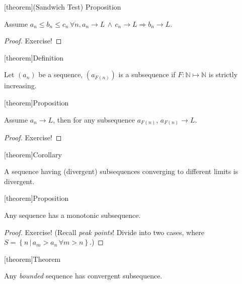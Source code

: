 \documentclass[12pt]{report}
\theoremstyle{definition}
\begin{document}
[theorem]{(Sandwich Test) Proposition}
\begin{sandwich theorem}
    Assume $a_n \le b_n \le c_n \,\forall n, 
    a_n \rightarrow{}L \,\wedge\, c_n \rightarrow{}L \Rightarrow{}b_n \rightarrow{}L$.
\end{sandwich theorem}

\begin{proof}
    Exercise!
\end{proof}

[theorem]{Definition}
\begin{subsequences}
    Let $(a_n)$ be a sequence, $(a_{F(n)})$ is a subsequence if $F: \mathbb{N} \mapsto{} \mathbb{N}$
    is strictly increasing.
\end{subsequences}

[theorem]{Proposition}
\begin{subsequence limit}
    Assume $a_n \rightarrow{} L$, then for any subsequence $a_{F(n)}$,
    $a_{F(n)} \rightarrow{} L$.
\end{subsequence limit}

\begin{proof}
    Exercise!
\end{proof}

[theorem]{Corollary}
\begin{divergent subsequence}
    A sequence having (divergent) subsequences converging to different limits is divergent.
\end{divergent subsequence}

[theorem]{Proposition}
\begin{monotonic subsequence}
    Any sequence has a monotonic subsequence.
\end{monotonic subsequence}

\begin{proof}
    Exercise! (Recall \emph{peak points}! Divide into two cases, where
    $S = \left\{n \,|\, a_m > a_n \,\forall m > n\right\} $.)
\end{proof}

[theorem]{Theorem}
\begin{Bolzano-weierstrass}
    Any \emph{bounded} sequence has convergent subsequence.
\end{Bolzano-weierstrass}
\end{document}

